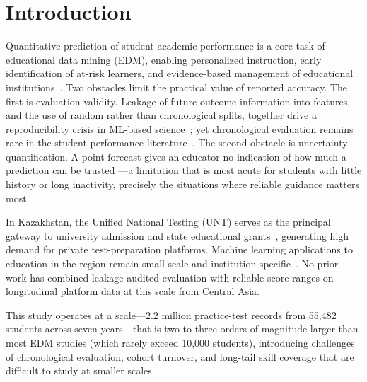 \documentclass[11pt]{article}
\begin{document}
\section{Introduction}

Quantitative prediction of student academic performance is a core task of educational data
mining (EDM), enabling personalized instruction, early identification of at-risk learners,
and evidence-based management of educational institutions~\cite{romero2020,zhang2021,baashar2021,aldin2024}.
Two obstacles limit the practical value of reported accuracy.
The first is evaluation validity.
Leakage of future outcome information into features, and the use of random rather than
chronological splits, together drive a reproducibility crisis in ML-based
science~\cite{kapoor2023}; yet chronological evaluation remains rare in the
student-performance literature~\cite{tashman2000,bergmeir2012}.
The second obstacle is uncertainty quantification.
A point forecast gives an educator no indication of how much a prediction can be trusted
---a limitation that is most acute for students with little history or long inactivity,
precisely the situations where reliable guidance matters most.

In Kazakhstan, the Unified National Testing (UNT) serves as the principal gateway to
university admission and state educational grants~\cite{didarbekova2025,oecd2017},
generating high demand for private test-preparation platforms.
Machine learning applications to education in the region remain small-scale and
institution-specific~\cite{turkmenbayev2025}.
No prior work has combined leakage-audited evaluation with reliable score ranges on
longitudinal platform data at this scale from Central Asia.

This study operates at a scale---2.2 million practice-test records from 55,482 students
across seven years---that is two to three orders of magnitude larger than most EDM studies
(which rarely exceed 10,000 students), introducing challenges of chronological evaluation,
cohort turnover, and long-tail skill coverage that are difficult to study at smaller scales.
\end{document}
